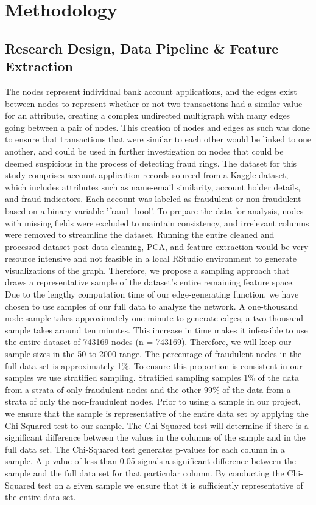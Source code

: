 \documentclass{styles/svproc}
\begin{document}
\section{Methodology}

\subsection*{Research Design, Data Pipeline \& Feature Extraction}
The nodes represent individual bank account applications, and the edges exist between nodes to represent whether or not two transactions had a similar value for an attribute, creating a complex undirected multigraph with many edges going between a pair of nodes. This creation of nodes and edges as such was done to ensure that transactions that were similar to each other would be linked to one another, and could be used in further investigation on nodes that could be deemed suspicious in the process of detecting fraud rings. The dataset for this study comprises account application records sourced from a Kaggle dataset, which includes attributes such as name-email similarity, account holder details, and fraud indicators. Each account was labeled as fraudulent or non-fraudulent based on a binary variable ’fraud\_bool’. To prepare the data for analysis, nodes with missing fields were excluded to maintain consistency, and irrelevant columns were removed to streamline the dataset. Running the entire cleaned and processed dataset post-data cleaning, PCA, and feature extraction would be very resource intensive and not feasible in a local RStudio environment to generate visualizations of the graph. Therefore, we propose a sampling approach that draws a representative sample of the dataset's entire remaining feature space. Due to the lengthy computation time of our edge-generating function, we have chosen to use samples of our full data to analyze the network. A one-thousand node sample takes approximately one minute to generate edges, a two-thousand sample takes around ten minutes. This increase in time makes it infeasible to use the entire dataset of 743169 nodes (n = 743169). Therefore, we will keep our sample sizes in the 50 to 2000 range. The percentage of fraudulent nodes in the full data set is approximately 1\%. To ensure this proportion is consistent in our samples we use stratified sampling. Stratified sampling samples 1\% of the data from a strata of only fraudulent nodes and the other 99\% of the data from a strata of only the non-fraudulent nodes. Prior to using a sample in our project, we ensure that the sample is representative of the entire data set by applying the Chi-Squared test to our sample. The Chi-Squared test will determine if there is a significant difference between the values in the columns of the sample and in the full data set. The Chi-Squared test generates p-values for each column in a sample. A p-value of less than 0.05 signals a significant difference between the sample and the full data set for that particular column. By conducting the Chi-Squared test on a given sample we ensure that it is sufficiently representative of the entire data set.
\end{document}
